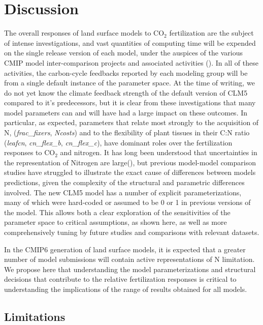 \documentclass[draft,linenumbers]{agujournal}
\begin{document}
\section{Discussion}
The overall responses of land surface models to CO$_{2}$ fertilization are the subject of intense investigations, and vast quantities of computing time will be expended on the single release version of each model, under the auspices of the various CMIP model inter-comparison projects and associated activities  (\cite{meehl2014}).  In all of these activities, the carbon-cycle feedbacks reported by each modeling group will be from a single default instance of the parameter space.  At the time of writing, we do not yet know the climate feedback strength of the default version of CLM5 compared to it's predecessors, but it is clear from these investigations that many model parameters can and will have had a large impact on these outcomes.  In particular, as expected, parameters that relate most strongly to the acquisition of N, (\emph{frac\_fixers}, \emph{Ncosts}) and to the flexibility of plant tissues in their C:N ratio (\emph{leafcn}, \emph{cn\_flex\_b}, \emph{cn\_flex\_c}), have dominant roles over the fertilization responses to CO$_{2}$ and nitrogen.  It has long been understood that uncertainties in the representation of Nitrogen are large(\cite{zaehle2014}), but previous model-model comparison studies have struggled to illustrate the exact cause of differences between models predictions, given the complexity of the structural and parametric differences involved. The new CLM5 model has a number of explicit parameterizations, many of which were hard-coded or assumed to be 0 or 1 in previous versions of the model. This allows both a clear exploration of the sensitivities of the parameter space to critical assumptions, as shown here, as well as more comprehensively tuning by future studies and comparisons with relevant datasets. 

In the CMIP6 generation of land surface models, it is expected that a greater number of model submissions will contain active representations of N limitation. We propose here that understanding the model parameterizations and structural decisions that contribute to the relative fertilization responses is critical to understanding the implications of the range of results obtained for all models. 

\subsection{Limitations}
\end{document}
